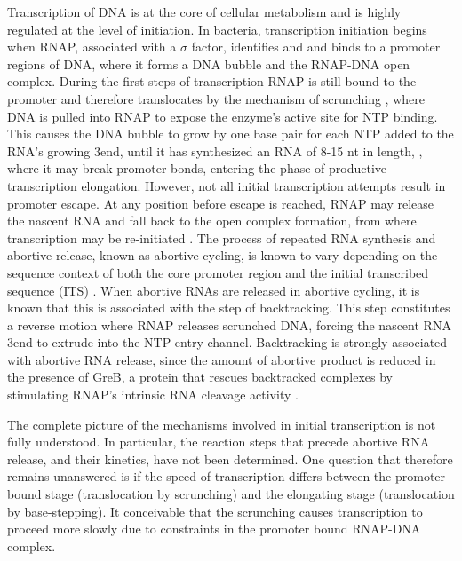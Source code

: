 %
Transcription of DNA is at the core of cellular metabolism and is highly
regulated at the level of initiation. In bacteria, transcription initiation
begins when RNAP, associated with a $\sigma$ factor, identifies and and binds
to a promoter regions of DNA, where it forms a DNA bubble and the RNAP-DNA
open complex. During the first steps of transcription RNAP is still bound to
the promoter and therefore translocates by the mechanism of scrunching
\cite{revyakin_abortive_2006, kapanidis_initial_2006}, where DNA is pulled
into RNAP to expose the enzyme's active site for NTP binding. This causes the
DNA bubble to grow by one base pair for each NTP added to the RNA's growing
3\ppp end, until it has synthesized an RNA of 8-15 nt in length,
\cite{carpousis_cycling_1980,hsu_vitro_2003,tang_real-time_2009,hsu_initial_2006},
where it may break promoter bonds, entering the phase of productive
transcription elongation. However, not all initial transcription attempts
result in promoter escape. At any position before escape is reached, RNAP may
release the nascent RNA and fall back to the open complex formation, from
where transcription may be re-initiated \cite{carpousis_cycling_1980}. The
process of repeated RNA synthesis and abortive release, known as abortive
cycling, is known to vary depending on the sequence context of both the core
promoter region and the initial transcribed sequence (ITS)
\cite{hsu_initial_2006, hsu_promoter_2002, vo_vitro_2003}. When abortive RNAs
are released in abortive cycling, it is known that this is associated with the
step of backtracking. This step constitutes a reverse motion where RNAP
releases scrunched DNA, forcing the nascent RNA 3\ppp end to extrude into the
NTP entry channel. Backtracking is strongly associated with abortive RNA
release, since the amount of abortive product is reduced in the presence of
GreB, a protein that rescues backtracked complexes by stimulating RNAP's
intrinsic RNA cleavage activity \cite{hsu_initial_2006, hsu_escherichia_1995,
feng_grea-induced_1994}.

The complete picture of the mechanisms involved in initial transcription is
not fully understood. In particular, the reaction steps that precede abortive
RNA release, and their kinetics, have not been determined. One question that
therefore remains unanswered is if the speed of transcription differs between
the promoter bound stage (translocation by scrunching) and the elongating
stage (translocation by base-stepping). It conceivable that the scrunching
causes transcription to proceed more slowly due to constraints in the promoter
bound RNAP-DNA complex.

